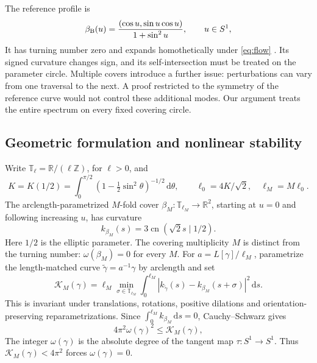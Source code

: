 \documentclass[a4paper,11pt]{article}
\numberwithin{equation}{section}
\theoremstyle{definition}
\theoremstyle{remark}
\newcommand{\R}{\mathbb R}
\newcommand{\Z}{\mathbb Z}
\newcommand{\T}{\mathbb T}
\newcommand{\dd}{\,\mathrm d}
\newcommand{\cn}{\operatorname{cn}}
\newcommand{\KM}{\mathcal K_M}
\begin{document}
The reference profile is
\begin{equation}\label{eq:beta}
 \beta_{\rm B}(u)=\frac{(\cos u,\sin u\cos u)}{1+\sin^2u},\qquad u\in S^1,
\end{equation}
It has turning number zero and expands homothetically under \eqref{eq:flow} \cite[Section~2.2.3]{MW}. Its signed curvature changes sign, and its self-intersection must be treated on the parameter circle. Multiple covers introduce a further issue: perturbations can vary from one traversal to the next. A proof restricted to the symmetry of the reference curve would not control these additional modes. Our argument treats the entire spectrum on every fixed covering circle.

\subsection{Geometric formulation and nonlinear stability}
Write $\T_\ell=\R/(\ell\Z)$, for $\ell>0$, and
\begin{equation}\label{eq:lengths}
 K=K(1/2)=\int_0^{\pi/2}(1-\tfrac12\sin^2\theta)^{-1/2}\dd\theta,
 \qquad \ell_0=4K/\sqrt2,\quad \ell_M=M\ell_0.
\end{equation}
The arclength-parametrized $M$-fold cover $\beta_M:\T_{\ell_M}\to\R^2$, starting at $u=0$ and following increasing $u$, has curvature
\begin{equation}\label{eq:reference-curvature}
 k_{\beta_M}(s)=3\cn(\sqrt2s\mid1/2).
\end{equation}
Here $1/2$ is the elliptic parameter. The covering multiplicity $M$ is distinct from the turning number: $\omega(\beta_M)=0$ for every $M$. For $a=L[\gamma]/\ell_M$, parametrize the length-matched curve $\widetilde\gamma=a^{-1}\gamma$ by arclength and set
\begin{equation}\label{eq:profile}
 \KM(\gamma)=\ell_M\min_{\sigma\in\T_{\ell_M}}
 \int_0^{\ell_M}|k_{\widetilde\gamma}(s)-k_{\beta_M}(s+\sigma)|^2\dd s.
\end{equation}
This is invariant under translations, rotations, positive dilations and orientation-preserving reparametrizations. Since $\int_0^{\ell_M}k_{\beta_M}\dd s=0$, Cauchy--Schwarz gives
\begin{equation}\label{eq:turn-lock}
 4\pi^2\omega(\gamma)^2\le\KM(\gamma),
\end{equation}
The integer $\omega(\gamma)$ is the absolute degree of the tangent map $\tau:S^1\to S^1$. Thus $\KM(\gamma)<4\pi^2$ forces $\omega(\gamma)=0$.
\end{document}

